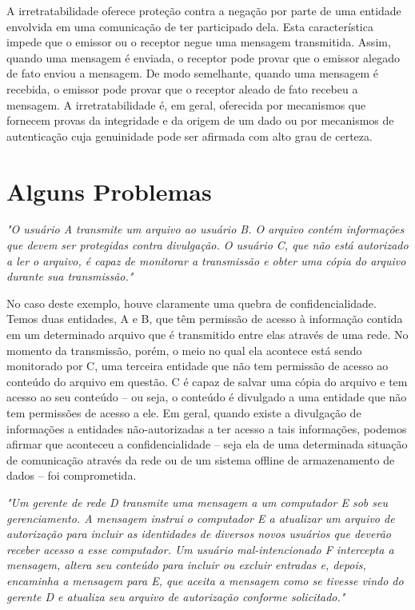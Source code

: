 \documentclass[
	10pt,				%
	openright,			%
	twoside,			%
	a5paper,			%
	english,			%
	french,				%
	spanish,			%
	brazil,				%
	sumario=tradicional
]{abntex2}
\begin{document}
A irretratabilidade oferece proteção contra a negação por parte de uma entidade envolvida em uma comunicação de ter participado dela. Esta característica impede que o emissor ou o receptor negue uma mensagem transmitida. Assim, quando uma mensagem é enviada, o receptor pode provar que o emissor alegado de fato enviou a mensagem. De modo semelhante, quando uma mensagem é recebida, o emissor pode provar que o receptor aleado de fato recebeu a mensagem. A irretratabilidade é, em geral, oferecida por mecanismos que fornecem provas da integridade e da origem de um dado ou por mecanismos de autenticação cuja genuinidade pode ser afirmada com alto grau de certeza.

\section{Alguns Problemas}

\textit{"O usuário A transmite um arquivo ao usuário B. O arquivo contém informações que devem ser protegidas contra divulgação. O usuário C, que não está autorizado a ler o arquivo, é capaz de monitorar a transmissão e obter uma cópia do arquivo durante sua transmissão."}

No caso deste exemplo, houve claramente uma quebra de confidencialidade. Temos duas entidades, A e B, que têm permissão de acesso à informação contida em um determinado arquivo que é transmitido entre elas através de uma rede. No momento da transmissão, porém, o meio no qual ela acontece está sendo monitorado por C, uma terceira entidade que não tem permissão de acesso ao conteúdo do arquivo em questão. C é capaz de salvar uma cópia do arquivo e tem acesso ao seu conteúdo -- ou seja, o conteúdo é divulgado a uma entidade que não tem permissões de acesso a ele. Em geral, quando existe a divulgação de informações a entidades não-autorizadas a ter acesso a tais informações, podemos afirmar que aconteceu a confidencialidade -- seja ela de uma determinada situação de comunicação através da rede ou de um sistema offline de armazenamento de dados -- foi comprometida.

\textit{"Um gerente de rede D transmite uma mensagem a um computador E sob seu gerenciamento. A mensagem instrui o computador E a atualizar um arquivo de autorização para incluir as identidades de diversos novos usuários que deverão receber acesso a esse computador. Um usuário mal-intencionado F intercepta a mensagem, altera seu conteúdo para incluir ou excluir entradas e, depois, encaminha a mensagem para E, que aceita a mensagem como se tivesse vindo do gerente D e atualiza seu arquivo de autorização conforme solicitado."}
\end{document}
